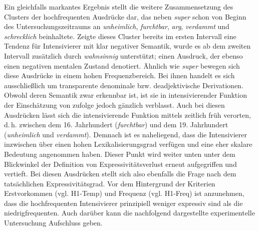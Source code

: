 Ein gleichfalls markantes Ergebnis stellt die weitere Zusammensetzung des Clusters der hochfrequenten Ausdrücke dar, das neben \textit{super} schon von Beginn des Untersuchungszeitraums an \textit{unheimlich}, \textit{furchtbar}, \textit{arg}, \textit{verdammt} und \textit{schrecklich} beinhaltete. Zeigte dieses Cluster bereits im ersten Intervall eine Tendenz für Intensivierer mit klar negativer Semantik, wurde es ab dem zweiten Intervall zusätzlich durch \textit{wahnsinnig} unterstützt; einen Ausdruck, der ebenso einen negativen mentalen Zustand denotiert. Ähnlich wie \textit{super} bewegen sich diese Ausdrücke in einem hohen Frequenzbereich. Bei ihnen handelt es sich ausschließlich um transparente denominale bzw. deadjektivische Derivationen. Obwohl deren Semantik zwar erkennbar ist, ist sie in intensivierender Funktion der Einschätzung von \citet[15f.]{Nouwen.2020} zufolge jedoch gänzlich verblasst. Auch bei diesen Ausdrücken lässt sich die intensivierende Funktion mittels \mbox{\citet[385, 525, 1499]{Pfeifer.1995}} zeitlich früh verorten, d.\,h. zwischen dem 16. Jahrhundert (\textit{furchtbar}) und dem 19. Jahrhundert (\textit{unheimlich} und \textit{verdammt}). Demnach ist es naheliegend, dass die Intensivierer inzwischen über einen hohen Lexikalisierungsgrad verfügen und eine eher skalare Bedeutung angenommen haben. Dieser Punkt wird weiter unten unter dem Blickwinkel der Definition von Expressivitätsverlust erneut aufgegriffen und vertieft. Bei diesen Ausdrücken stellt sich also ebenfalls die Frage nach dem tatsächlichen Expressivitätsgrad. Vor dem Hintergrund der Kriterien Erstvorkommen (vgl. \mbox{H1-Temp}) und Frequenz (vgl. H1-Freq) ist anzunehmen, dass die hochfrequenten Intensivierer prinzipiell weniger expressiv sind als die niedrigfrequenten. Auch darüber kann die nachfolgend dargestellte experimentelle Untersuchung Aufschluss geben.

